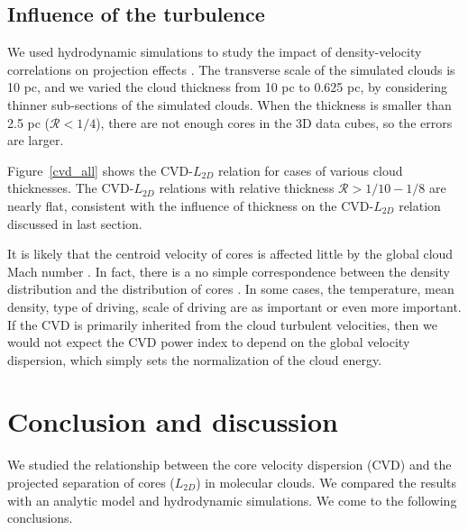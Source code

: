 \documentclass[iop,revtex4]{emulateapj}
\begin{document}
\subsection{Influence of the turbulence}

We used hydrodynamic simulations to study the impact of density-velocity correlations on projection effects \citep[e.g.][]{Brunt2004}. The transverse scale of the simulated clouds is 10 pc, and we varied the cloud thickness from 10 pc to 0.625 pc, by considering thinner sub-sections of the simulated clouds. When the thickness is smaller than 2.5 pc ($\mathcal{R}<1/4$), there are not enough cores in the 3D data cubes, so the errors are larger.


Figure~\ref{cvd_all} shows the CVD-$L_{2D}$ relation for cases of various cloud thicknesses. The CVD-$L_{2D}$ relations with relative thickness $\mathcal{R}>1/10-1/8$ are nearly flat, consistent with the influence of thickness on the CVD-$L_{2D}$ relation discussed in last section.

%


It is likely that the centroid velocity of cores is affected little by the global cloud Mach number \citep[see also][]{Offner2009}. In fact, there is a no simple correspondence between the density distribution and the distribution of cores \citep{Padoan2002}. In some cases, the temperature, mean density, type of driving, scale of driving are as important or even more important. If the CVD is primarily inherited from the cloud turbulent velocities, then we would not expect the CVD power index to depend on the global velocity dispersion, which simply sets the normalization of the cloud energy.






\section{Conclusion and discussion}
\label{sec:conclusion}
We studied the relationship between the core velocity dispersion (CVD) and the projected separation of cores ($L_{2D}$)  in molecular clouds. We compared the results with an analytic model and hydrodynamic  simulations. We come to the following conclusions.
\end{document}
